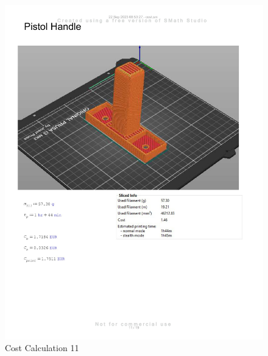\begin{figure}[H]
    \centering
    \includegraphics[width=\linewidth]{texs/appendix/data/costcalculation/cost1-11.jpg}
    \caption{Cost Calculation 11}
    \label{fig:cost-calculation-11}
\end{figure}

